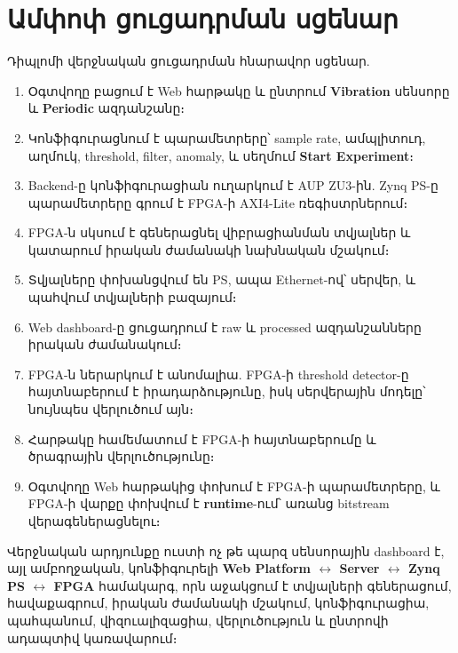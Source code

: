 \chapter{Ամփոփ ցուցադրման սցենար}

Դիպլոմի վերջնական ցուցադրման հնարավոր սցենար.

\begin{enumerate}[leftmargin=1.6em]
  \item Օգտվողը բացում է Web հարթակը և ընտրում \textbf{Vibration} սենսորը և
        \textbf{Periodic} ազդանշանը։
  \item Կոնֆիգուրացնում է պարամետրերը՝ sample rate, ամպլիտուդ, աղմուկ, threshold,
        filter, anomaly, և սեղմում \textbf{Start Experiment}։
  \item Backend-ը կոնֆիգուրացիան ուղարկում է AUP ZU3-ին. Zynq PS-ը պարամետրերը
        գրում է FPGA-ի AXI4-Lite ռեգիստրներում։
  \item FPGA-ն սկսում է գեներացնել վիբրացիանման տվյալներ և կատարում իրական ժամանակի
        նախնական մշակում։
  \item Տվյալները փոխանցվում են PS, ապա Ethernet-ով՝ սերվեր, և պահվում տվյալների բազայում։
  \item Web dashboard-ը ցուցադրում է raw և processed ազդանշանները իրական ժամանակում։
  \item FPGA-ն ներարկում է անոմալիա. FPGA-ի threshold detector-ը հայտնաբերում է
        իրադարձությունը, իսկ սերվերային մոդելը՝ նույնպես վերլուծում այն։
  \item Հարթակը համեմատում է FPGA-ի հայտնաբերումը և ծրագրային վերլուծությունը։
  \item Օգտվողը Web հարթակից փոխում է FPGA-ի պարամետրերը, և FPGA-ի վարքը փոխվում է
        \textbf{runtime}-ում՝ առանց bitstream վերագեներացնելու։
\end{enumerate}

Վերջնական արդյունքը ուստի ոչ թե պարզ սենսորային dashboard է, այլ ամբողջական,
կոնֆիգուրելի \textbf{Web Platform $\leftrightarrow$ Server $\leftrightarrow$ Zynq PS
$\leftrightarrow$ FPGA} համակարգ, որն աջակցում է տվյալների գեներացում, հավաքագրում,
իրական ժամանակի մշակում, կոնֆիգուրացիա, պահպանում, վիզուալիզացիա, վերլուծություն և
ընտրովի ադապտիվ կառավարում։
